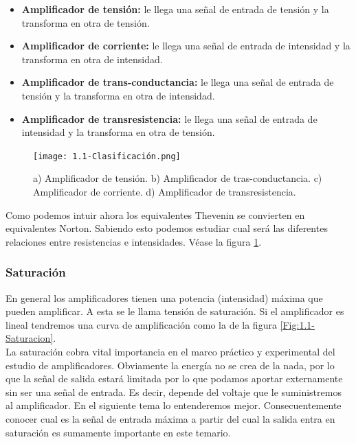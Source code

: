 \documentclass[12pt,a4paper]{article}
\numberwithin{equation}{section}
\numberwithin{figure}{section}
\begin{document}
\begin{itemize}
\item \textbf{Amplificador de tensión:} le llega una señal de entrada de tensión y la transforma en otra de tensión.
\item \textbf{Amplificador de corriente:} le llega una señal de entrada de intensidad y la transforma en otra de intensidad.
\item \textbf{Amplificador de trans-conductancia:} le llega una señal de entrada de tensión y la  transforma en otra de intensidad.
\item \textbf{Amplificador de transresistencia:} le llega una señal de entrada de intensidad y la transforma en otra de tensión.
\end{itemize}


\begin{figure}[h!] \centering
\texttt{[image: 1.1-Clasificación.png]}
\caption{a) Amplificador de tensión. b) Amplificador de tras-conductancia. c) Amplificador de corriente. d) Amplificador de transresistencia.}
\label{Fig:1.1-Clasificaion}
\end{figure}

Como podemos intuir ahora los equivalentes Thevenin se convierten en equivalentes Norton. Sabiendo esto podemos estudiar cual será las diferentes relaciones entre resistencias e intensidades. Véase la figura \ref{Fig:1.1-Clasificaion}.

\subsubsection{Saturación}

En general los amplificadores tienen una potencia (intensidad) máxima que pueden amplificar. A esta se le llama tensión de saturación. Si el amplificador es lineal tendremos una curva de amplificación como la de la figura \ref{Fig:1.1-Saturacion}. \\


La saturación cobra vital importancia en el marco práctico y experimental del estudio de amplificadores. Obviamente la energía no se crea de la nada, por lo que la señal de salida estará limitada por lo que podamos aportar externamente sin ser una señal de entrada. Es decir, depende del voltaje que le suministremos al amplificador. En el siguiente tema lo entenderemos mejor. Consecuentemente conocer cual es la señal de entrada máxima a partir del cual la salida entra en saturación es sumamente importante en este temario.
\end{document}
